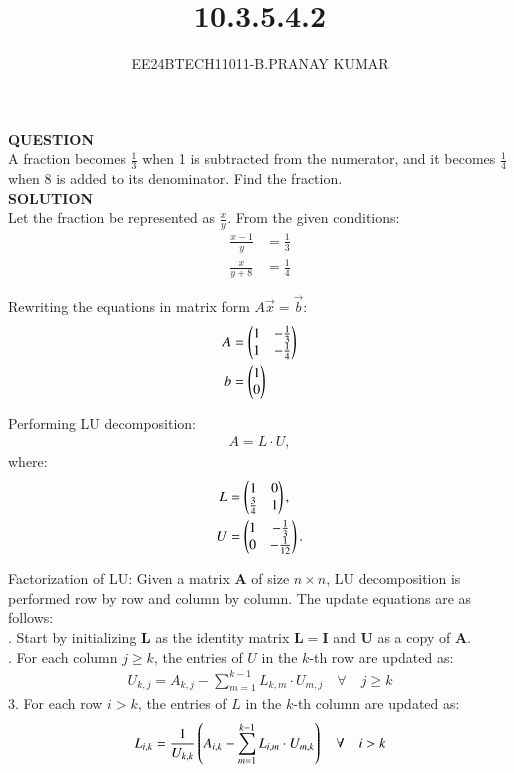 \documentclass[journal]{IEEEtran}
\begin{document}

\vspace{3cm}

\title{10.3.5.4.2}
\author{EE24BTECH11011-B.PRANAY KUMAR}
{\let\newpage\relax\maketitle}

\renewcommand{\thefigure}{\theenumi}
\renewcommand{\thetable}{\theenumi}
\setlength{\intextsep}{10pt} 

\renewcommand{\thetable}{\theenumi}

\textbf{QUESTION} \\
A fraction becomes $\frac{1}{3}$ when 1 is subtracted from the numerator, and it becomes $\frac{1}{4}$ when 8 is added to its denominator. Find the fraction.\\

\textbf{SOLUTION} \\
Let the fraction be represented as $\frac{x}{y}$. From the given conditions:
\begin{align}
    \frac{x - 1}{y} &= \frac{1}{3} \\
    \frac{x}{y + 8} &= \frac{1}{4}
\end{align}

Rewriting the equations in matrix form $A\vec{x} = \vec{b}$:
\begin{align}
A &= \begin{pmatrix} 1 & -\frac{1}{3} \\ 1 & -\frac{1}{4} \end{pmatrix}\\
b &=  \begin{pmatrix} 1 \\ 0\end{pmatrix}
\end{align}

Performing LU decomposition:
\begin{align}
    A = L \cdot U,
\end{align}
where:
\begin{align}
    L &= \begin{pmatrix}1 & 0 \\ \frac{3}{4} & 1\end{pmatrix}, \\
    U &= \begin{pmatrix}1 & -\frac{1}{3} \\ 0 & -\frac{1}{12}\end{pmatrix}.
\end{align}

Factorization of LU:
Given a matrix $ \mathbf{A} $ of size $ n \times n $, LU decomposition is performed row by row and column by column. The update equations are as follows: \\
. Start by initializing $ \mathbf{L} $ as the identity matrix $ \mathbf{L} = \mathbf{I} $ and $ \mathbf{U} $ as a copy of $ \mathbf{A} $.\\
. For each column $ j \geq k $, the entries of $ U $ in the $ k $-th row are updated as:
\begin{align}
U_{k,j} = A_{k,j} - \sum_{m=1}^{k-1} L_{k,m} \cdot U_{m,j}\quad \forall \quad j \geq k
\end{align}
3. For each row $ i > k $, the entries of $ L $ in the $ k $-th column are updated as:
\begin{align}
L_{i,k} = \frac{1}{U_{k,k}} \left( A_{i,k} - \sum_{m=1}^{k-1} L_{i,m} \cdot U_{m,k}\right) \quad \forall \quad i > k
\end{align}
\end{document}
